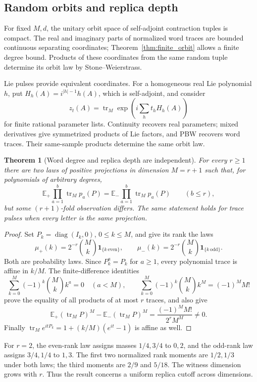\documentclass[11pt,a4paper]{amsart}
\numberwithin{equation}{section}
\newtheorem{theorem}{Theorem}[section]
\theoremstyle{definition}
\theoremstyle{remark}
\newcommand{\E}{\mathbb E}
\DeclareMathOperator{\tr}{tr}
\DeclareMathOperator{\diag}{diag}
\begin{document}
\subsection{Random orbits and replica depth}
For fixed $M,d$, the unitary orbit space of self-adjoint contraction tuples is compact. The real and imaginary parts of normalized word traces are bounded continuous separating coordinates; Theorem~\ref{thm:finite_orbit} allows a finite degree bound. Products of these coordinates from the same random tuple determine its orbit law by Stone--Weierstrass.

Lie pulses provide equivalent coordinates. For a homogeneous real Lie polynomial $h$, put $H_h(A)=i^{|h|-1}h(A)$, which is self-adjoint, and consider
\[
 z_t(A)=\tr_M\exp\left(i\sum_ht_hH_h(A)\right)
\]
for finite rational parameter lists. Continuity recovers real parameters; mixed derivatives give symmetrized products of Lie factors, and PBW recovers word traces. Their same-sample products determine the same orbit law.

\begin{theorem}[Word degree and replica depth are independent]\label{thm:replica_obstruction}
For every $r\ge1$ there are two laws of positive projections in dimension $M=r+1$ such that, for polynomials of arbitrary degrees,
\begin{equation}\label{eq:replica_equal}
 \E_+\prod_{a=1}^b\tr_Mp_a(P)
 =\E_-\prod_{a=1}^b\tr_Mp_a(P)\qquad(b\le r),
\end{equation}
but some $(r+1)$-fold observation differs. The same statement holds for trace pulses when every letter is the same projection.
\end{theorem}
\begin{proof}
Set $P_k=\diag(I_k,0)$, $0\le k\le M$, and give its rank the laws
\begin{equation}\label{eq:replica_rank_laws}
 \mu_+(k)=2^{-r}\binom Mk\mathbf1_{\{k\ \text{even}\}},\qquad
 \mu_-(k)=2^{-r}\binom Mk\mathbf1_{\{k\ \text{odd}\}}.
\end{equation}
Both are probability laws. Since $P_k^a=P_k$ for $a\ge1$, every polynomial trace is affine in $k/M$. The finite-difference identities
\[
 \sum_{k=0}^M(-1)^k\binom Mk k^a=0\quad(a<M),\qquad
 \sum_{k=0}^M(-1)^k\binom Mk k^M=(-1)^MM!
\]
prove the equality of all products of at most $r$ traces, and also give
\begin{equation}\label{eq:replica_gap}
 \E_+(\tr_MP)^M-\E_-(\tr_MP)^M
 =\frac{(-1)^MM!}{2^rM^M}\ne0.
\end{equation}
Finally $\tr_Me^{itP_k}=1+(k/M)(e^{it}-1)$ is affine as well.
\end{proof}
For $r=2$, the even-rank law assigns masses $1/4,3/4$ to $0,2$, and the odd-rank law assigns $3/4,1/4$ to $1,3$. The first two normalized rank moments are $1/2,1/3$ under both laws; the third moments are $2/9$ and $5/18$. The witness dimension grows with $r$. Thus the result concerns a uniform replica cutoff across dimensions.
\end{document}
